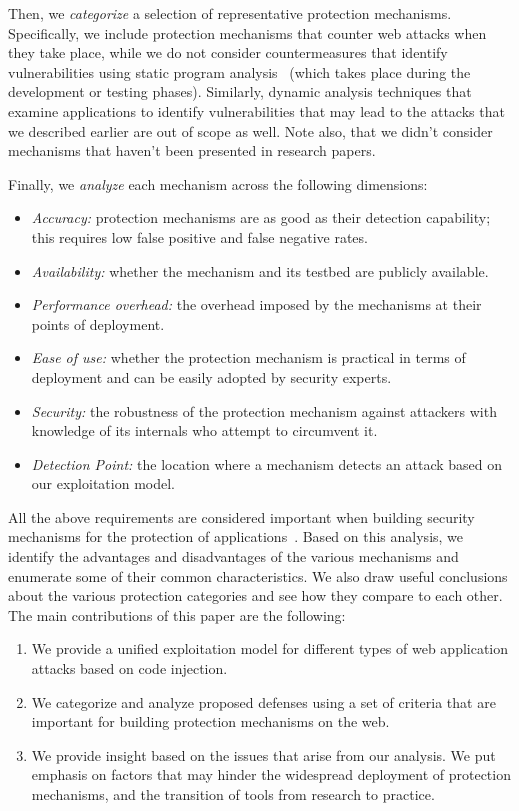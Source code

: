 \documentclass[10pt,journal,compsoc]{IEEEtran}
\begin{document}
Then, we {\it categorize} a selection of representative
protection mechanisms. Specifically, we include protection
mechanisms that counter web attacks when they take place,
while we do not consider countermeasures that identify
vulnerabilities using static program analysis~\cite{SZ12}
(which takes place during the development or testing
phases). Similarly, dynamic analysis techniques that examine
applications to identify vulnerabilities that may lead to the attacks
that we described earlier are out of scope as well. Note also, that we
didn't consider mechanisms that haven't been presented in research papers.

Finally, we {\it analyze} each mechanism across the
following dimensions:
\begin{itemize}
\item {\it Accuracy:} protection mechanisms are as good
  as their detection capability; this requires low false positive and
  false negative rates.
\item {\it Availability:} whether the mechanism and its
  testbed are publicly available.
\item {\it Performance overhead:} the 
  overhead imposed by the mechanisms at their points of deployment.
\item {\it Ease of use:} whether the protection
  mechanism is practical in terms of deployment
  and can be easily adopted by security experts.
\item {\it Security:} the robustness of the protection mechanism against
  attackers with knowledge of its internals who attempt to circumvent it.
\item {\it Detection Point:} the location where a mechanism detects an attack
  based on our exploitation model.
\end{itemize}

\noindent
All the above requirements are considered important
when building security mechanisms for the protection of
applications~\cite{A01,A00,SPWS13,nature2014}.
Based on this analysis, we identify the advantages
and disadvantages of the
various mechanisms and enumerate some of their common
characteristics. We also draw useful conclusions
about the various protection categories and see how they compare
to each other.
The main contributions of this paper are the following:

\begin{enumerate}
\item We provide a unified exploitation model for different types of
  web application attacks based on code injection.
\item We categorize and analyze proposed defenses using a set of
  criteria that are important for building protection mechanisms on the web.
\item We provide insight based on the issues that arise from our analysis. We put
  emphasis on factors that may hinder the widespread deployment of
  protection mechanisms, and the transition of tools from research to practice.
\end{enumerate}
\end{document}
